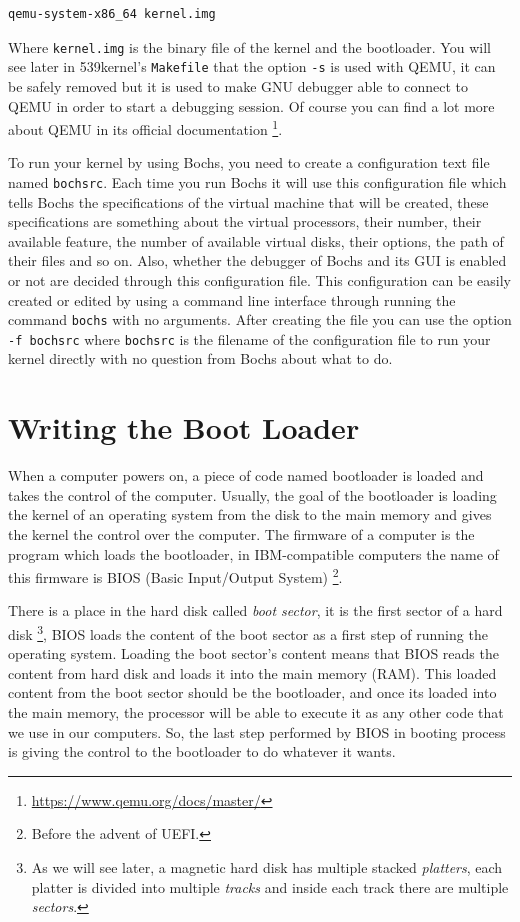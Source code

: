 \begin{lstlisting}
qemu-system-x86_64 kernel.img
\end{lstlisting}

Where \lstinline!kernel.img! is the binary file of the kernel and the
bootloader. You will see later in 539kernel's \lstinline!Makefile! that
the option \lstinline!-s! is used with QEMU, it can be safely removed
but it is used to make GNU debugger able to connect to QEMU in order to
start a debugging session. Of course you can find a lot more about QEMU
in its official documentation \footnote{\url{https://www.qemu.org/docs/master/}}.

To run your kernel by using Bochs, you need to create a configuration
text file named \lstinline!bochsrc!. Each time you run Bochs it will use
this configuration file which tells Bochs the specifications of the
virtual machine that will be created, these specifications are something
about the virtual processors, their number, their available feature, the
number of available virtual disks, their options, the path of their
files and so on. Also, whether the debugger of Bochs and its GUI is
enabled or not are decided through this configuration file. This
configuration can be easily created or edited by using a command line
interface through running the command \lstinline!bochs! with no
arguments. After creating the file you can use the option
\lstinline!-f bochsrc! where \lstinline!bochsrc! is the filename of the
configuration file to run your kernel directly with no question from
Bochs about what to do.

\section{Writing the Boot Loader}\label{writing-the-boot-loader}

When a computer powers on, a piece of code named bootloader is loaded
and takes the control of the computer. Usually, the goal of the
bootloader is loading the kernel of an operating system from the disk to
the main memory and gives the kernel the control over the computer. The
firmware of a computer is the program which loads the bootloader, in
IBM-compatible computers the name of this firmware is BIOS (Basic
Input/Output System) \footnote{Before the advent of UEFI.}.

There is a place in the hard disk called \emph{boot sector}, it is the
first sector of a hard disk \footnote{As we will see later, a magnetic
  hard disk has multiple stacked \emph{platters}, each platter is
  divided into multiple \emph{tracks} and inside each track there are
  multiple \emph{sectors}.}, BIOS loads the content of the boot sector
as a first step of running the operating system. Loading the boot
sector's content means that BIOS reads the content from hard disk and
loads it into the main memory (RAM). This loaded content from the boot
sector should be the bootloader, and once its loaded into the main
memory, the processor will be able to execute it as any other code that
we use in our computers. So, the last step performed by BIOS in booting
process is giving the control to the bootloader to do whatever it wants.

